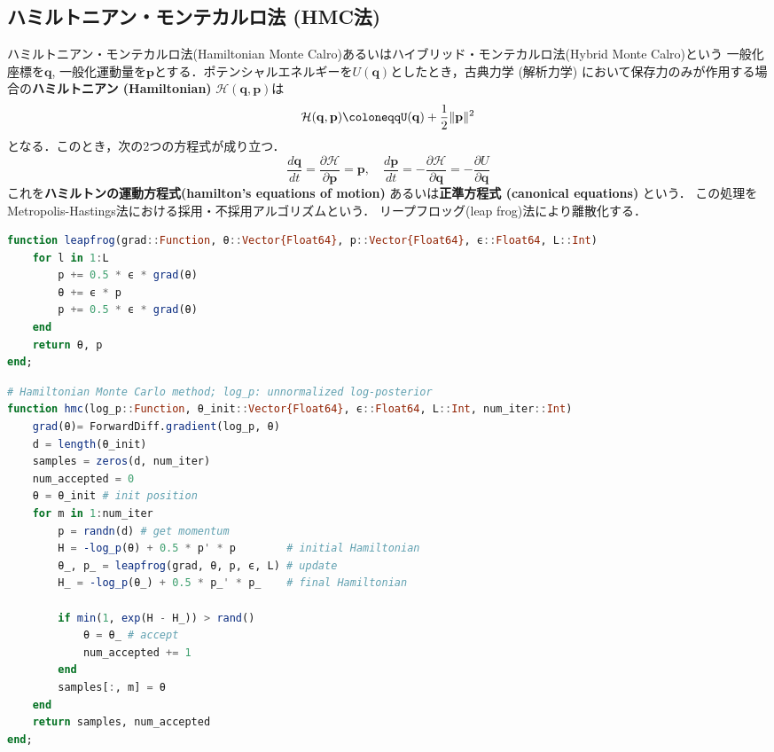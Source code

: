 \subsection{ハミルトニアン・モンテカルロ法 (HMC法)}
ハミルトニアン・モンテカルロ法(Hamiltonian Monte Calro)あるいはハイブリッド・モンテカルロ法(Hybrid Monte Calro)という
一般化座標を$\mathbf{q}$, 一般化運動量を$\mathbf{p}$とする．ポテンシャルエネルギーを$U(\mathbf{q})$としたとき，古典力学 (解析力学) において保存力のみが作用する場合の\textbf{ハミルトニアン (Hamiltonian)} $\mathcal{H}(\mathbf{q}, \mathbf{p})$は
\begin{equation}
\mathcal{H}(\mathbf{q}, \mathbf{p})\coloneqqU(\mathbf{q})+\frac{1}{2}\|\mathbf{p}\|^2
\end{equation}
となる．このとき，次の2つの方程式が成り立つ．
\begin{equation}
\frac{d\mathbf{q}}{dt}=\frac{\partial \mathcal{H}}{\partial \mathbf{p}}=\mathbf{p},\quad\frac{d\mathbf{p}}{dt}=-\frac{\partial \mathcal{H}}{\partial \mathbf{q}}=-\frac{\partial U}{\partial \mathbf{q}}
\end{equation}
これを\textbf{ハミルトンの運動方程式(hamilton's equations of motion)} あるいは\textbf{正準方程式 (canonical equations)} という．
この処理をMetropolis-Hastings法における採用・不採用アルゴリズムという．
リープフロッグ(leap frog)法により離散化する．
\begin{lstlisting}[language=julia]
function leapfrog(grad::Function, θ::Vector{Float64}, p::Vector{Float64}, ϵ::Float64, L::Int)
    for l in 1:L
        p += 0.5 * ϵ * grad(θ)
        θ += ϵ * p
        p += 0.5 * ϵ * grad(θ)
    end
    return θ, p
end;
\end{lstlisting}
\begin{lstlisting}[language=julia]
# Hamiltonian Monte Carlo method; log_p: unnormalized log-posterior
function hmc(log_p::Function, θ_init::Vector{Float64}, ϵ::Float64, L::Int, num_iter::Int)
    grad(θ)= ForwardDiff.gradient(log_p, θ)
    d = length(θ_init)
    samples = zeros(d, num_iter)
    num_accepted = 0
    θ = θ_init # init position
    for m in 1:num_iter
        p = randn(d) # get momentum        
        H = -log_p(θ) + 0.5 * p' * p        # initial Hamiltonian
        θ_, p_ = leapfrog(grad, θ, p, ϵ, L) # update
        H_ = -log_p(θ_) + 0.5 * p_' * p_    # final Hamiltonian
        
        if min(1, exp(H - H_)) > rand()
            θ = θ_ # accept
            num_accepted += 1
        end
        samples[:, m] = θ
    end
    return samples, num_accepted
end;
\end{lstlisting}
